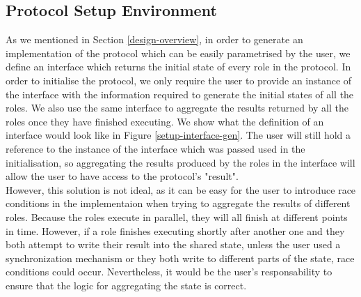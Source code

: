 \documentclass[12pt,twoside]{report}
\begin{document}
\subsection{Protocol Setup Environment}

As we mentioned in Section \ref{design-overview}, in order to generate an implementation of the protocol which can be easily parametrised by the user, we define an interface which returns the initial state of every role in the protocol. In order to initialise the protocol, we only require the user to provide an instance of the interface with the information required to generate the initial states of all the roles. We also use the same interface to aggregate the results returned by all the roles once they have finished executing. We show what the definition of an interface would look like in Figure \ref{setup-interface-gen}. The user will still hold a reference to the instance of the interface which was passed used in the initialisation, so aggregating the results produced by the roles in the interface will allow the user to have access to the protocol's "result".\\

However, this solution is not ideal, as it can be easy for the user to introduce race conditions in the implementaion when trying to aggregate the results of different roles. Because the roles execute in parallel, they will all finish at different points in time. However, if a role finishes executing shortly after another one and they both attempt to write their result into the shared state, unless the user used a synchronization mechanism or they both write to different parts of the state, race conditions could occur. Nevertheless, it would be the user's responsability to ensure that the logic for aggregating the state is correct.
\end{document}
